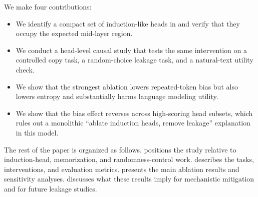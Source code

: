 We make four contributions:
\begin{itemize}
    \item We identify a compact set of induction-like heads in \gptsmall and verify that they occupy the expected mid-layer region.
    \item We conduct a head-level causal study that tests the same intervention on a controlled copy task, a random-choice leakage task, and a natural-text utility check.
    \item We show that the strongest ablation lowers repeated-token bias but also lowers entropy and substantially harms language modeling utility.
    \item We show that the bias effect reverses across high-scoring head subsets, which rules out a monolithic ``ablate induction heads, remove leakage'' explanation in this model.
\end{itemize}

The rest of the paper is organized as follows.  positions the study relative to induction-head, memorization, and randomness-control work.  describes the tasks, interventions, and evaluation metrics.  presents the main ablation results and sensitivity analyses.  discusses what these results imply for mechanistic mitigation and for future leakage studies.
